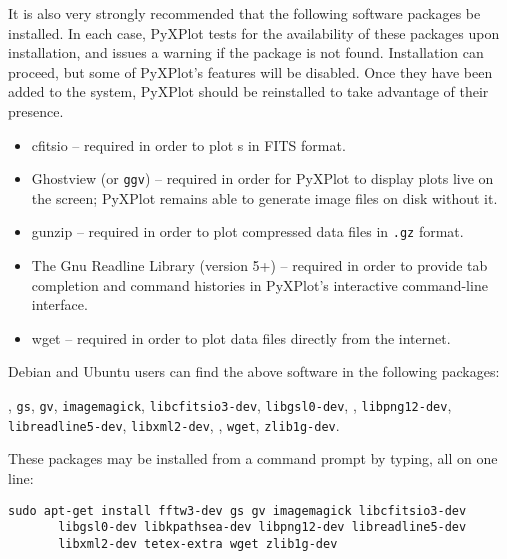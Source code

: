 \noindent It is also very strongly recommended that the following software
packages be installed. In each case, PyXPlot tests for the availability of
these packages upon installation, and issues a warning if the package is not
found. Installation can proceed, but some of PyXPlot's features will be
disabled. Once they have been added to the system, PyXPlot should be
reinstalled to take advantage of their presence.

\vspace{0.5cm}
\begin{itemize}
\item cfitsio -- required in order to plot \datafile s in FITS format.
\item Ghostview (or {\tt ggv})  -- required in order for PyXPlot to display plots live on the screen; PyXPlot remains able to generate image files on disk without it.
\item gunzip  -- required in order to plot compressed data files in {\tt .gz} format.
\item The Gnu Readline Library (version 5+)  -- required in order to provide tab completion and command histories in PyXPlot's interactive command-line interface.
\item wget  -- required in order to plot data files directly from the internet.
\end{itemize}
\vspace{0.5cm}

Debian and Ubuntu users can find the above software in the following packages:

\vspace{2mm}
, {\tt gs}, {\tt gv}, {\tt imagemagick}, {\tt libcfitsio3-dev}, {\tt libgsl0-dev},\newline
{}, {\tt libpng12-dev}, {\tt libreadline5-dev}, {\tt libxml2-dev},\newline
{}, {\tt wget}, {\tt zlib1g-dev}.
\vspace{2mm}

\noindent These packages may be installed from a command prompt by typing, all on one line:

\begin{verbatim}
sudo apt-get install fftw3-dev gs gv imagemagick libcfitsio3-dev
       libgsl0-dev libkpathsea-dev libpng12-dev libreadline5-dev
       libxml2-dev tetex-extra wget zlib1g-dev
\end{verbatim}

